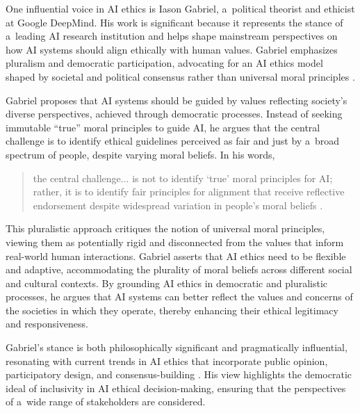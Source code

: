 \documentclass[%
  manuscript=article,
  year=2024,
  volume=77,
  doi=00000.000,
]{zfn}
\begin{document}
One influential voice in AI ethics is Iason Gabriel, a~political theorist and ethicist at Google DeepMind. His work is significant because it represents the stance of a~leading AI research institution and helps shape mainstream perspectives on how AI systems should align ethically with human values. Gabriel emphasizes pluralism and democratic participation, advocating for an AI ethics model shaped by societal and political consensus rather than universal moral principles 
\parencite[][]{gabriel_artificial_2020}.%




Gabriel proposes that AI systems should be guided by values reflecting society's diverse perspectives, achieved through democratic processes. Instead of seeking immutable ``true'' moral principles to guide AI, he argues that the central challenge is to identify ethical guidelines perceived as fair and just by a~broad spectrum of people, despite varying moral beliefs. In his words,



\begin{quote}
the central challenge... is not to identify ‘true' moral principles for AI; rather, it is to identify fair principles for alignment that receive reflective endorsement despite widespread variation in people's moral beliefs 
\parencite[][p.411]{gabriel_artificial_2020}.%
\end{quote}




This pluralistic approach critiques the notion of universal moral principles, viewing them as potentially rigid and disconnected from the values that inform real-world human interactions. Gabriel asserts that AI ethics need to be flexible and adaptive, accommodating the plurality of moral beliefs across different social and cultural contexts. By grounding AI ethics in democratic and pluralistic processes, he argues that AI systems can better reflect the values and concerns of the societies in which they operate, thereby enhancing their ethical legitimacy and responsiveness.



Gabriel's stance is both philosophically significant and pragmatically influential, resonating with current trends in AI ethics that incorporate public opinion, participatory design, and consensus-building 
\parencite[][]{world_economic_forum_ai_2024}. %
 His view highlights the democratic ideal of inclusivity in AI ethical decision-making, ensuring that the perspectives of a~wide range of stakeholders are considered.
\end{document}
